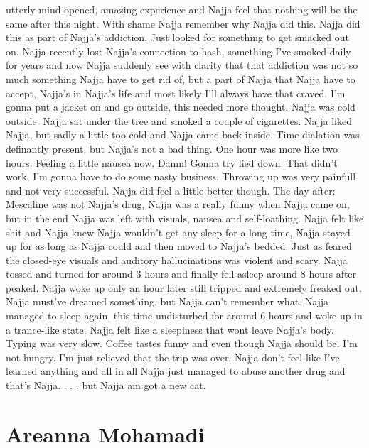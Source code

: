 \documentclass[12pt]{book}
\begin{document}
utterly mind opened, amazing experience and Najja feel that nothing will be the same after this night. With shame Najja remember why Najja did this. Najja did this as part of Najja's addiction. Just looked for something to get smacked out on. Najja recently lost Najja's connection to hash, something I've smoked daily for years and now Najja suddenly see with clarity that that addiction was not so much something Najja have to get rid of, but a part of Najja that Najja have to accept, Najja's in Najja's life and most likely I'll always have that craved. I'm gonna put a jacket on and go outside, this needed more thought. Najja was cold outside. Najja sat under the tree and smoked a couple of cigarettes. Najja liked Najja, but sadly a little too cold and Najja came back inside. Time dialation was definantly present, but Najja's not a bad thing. One hour was more like two hours. Feeling a little nausea now. Damn! Gonna try lied down. That didn't work, I'm gonna have to do some nasty business. Throwing up was very painfull and not very successful. Najja did feel a little better though. The day after: Mescaline was not Najja's drug, Najja was a really funny when Najja came on, but in the end Najja was left with visuals, nausea and self-loathing. Najja felt like shit and Najja knew Najja wouldn't get any sleep for a long time, Najja stayed up for as long as Najja could and then moved to Najja's bedded. Just as feared the closed-eye visuals and auditory hallucinations was violent and scary. Najja tossed and turned for around 3 hours and finally fell asleep around 8 hours after peaked. Najja woke up only an hour later still tripped and extremely freaked out. Najja must've dreamed something, but Najja can't remember what. Najja managed to sleep again, this time undisturbed for around 6 hours and woke up in a trance-like state. Najja felt like a sleepiness that wont leave Najja's body. Typing was very slow. Coffee tastes funny and even though Najja should be, I'm not hungry. I'm just relieved that the trip was over. Najja don't feel like I've learned anything and all in all Najja just managed to abuse another drug and that's Najja.  . . .  but Najja am got a new cat.






\chapter{Areanna Mohamadi}
\end{document}
